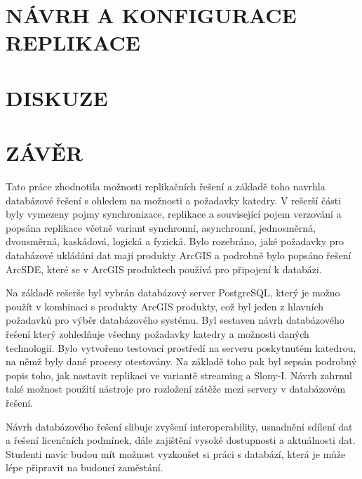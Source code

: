 \documentclass{thesisKGI}
\begin{document}
    \newpage
    \section{NÁVRH A KONFIGURACE REPLIKACE}
      
      
      
      
      
      

    \newpage
    \section{DISKUZE}

    \newpage
    \section{ZÁVĚR}
Tato práce zhodnotila možnosti replikačních řešení a základě toho navrhla databázové řešení s ohledem na možnosti a požadavky katedry. V rešerší části byly vymezeny pojmy synchronizace, replikace a související pojem verzování a popsána replikace včetně variant synchronní, asynchronní, jednosměrná, dvousměrná, kaskádová, logická a fyzická. Bylo rozebráno, jaké požadavky pro databázové ukládání dat mají produkty ArcGIS a podrobně bylo popsáno řešení ArcSDE, které se v ArcGIS produktech používá pro připojení k databázi.

Na základě rešerše byl vybrán databázový server PostgreSQL, který je možno použít v kombinaci s produkty ArcGIS produkty, což byl jeden z hlavních požadavků pro výběr databázového systému. Byl sestaven návrh databázového řešení který zohledňuje všechny požadavky katedry a možnosti daných technologií. Bylo vytvořeno testovací prostředí na serveru poskytnutém katedrou, na němž byly dané procesy otestovány. Na základě toho pak byl sepsán podrobný popis toho, jak nastavit replikaci ve variantě streaming a Slony-I. Návrh zahrnul také možnost použití nástroje pro rozložení zátěže mezi servery v databázovém řešení.

Návrh databázového řešení slibuje zvyšení interoperability,  usnadnění sdílení dat a řešení licenčních podmínek, dále zajištění vysoké dostupnosti a aktuálnosti dat. Studenti navíc budou mít možnost vyzkoušet si práci s databází, která je může lépe připravit na budoucí zaměstání.
\end{document}
